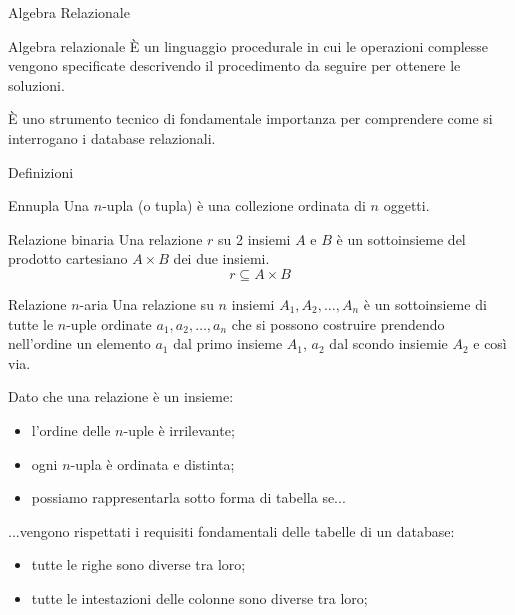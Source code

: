 \begin{frame}{Algebra Relazionale}
    \begin{block}{Algebra relazionale}
        \`E un linguaggio procedurale in cui le operazioni complesse vengono specificate descrivendo il procedimento da seguire per ottenere le soluzioni.
    \end{block}
    
    \noindent \`E uno strumento tecnico di fondamentale importanza per comprendere come si interrogano i database relazionali.
        
    
    \end{frame}
    \begin{frame}[allowframebreaks]{Definizioni}
        \begin{minipage}{0.7\textwidth}
            \begin{block}{Ennupla}
                Una $n$-upla (o tupla) \`e una collezione ordinata di $n$ oggetti.
            \end{block}
          \end{minipage}
        \begin{block}{Relazione binaria}
            Una relazione $r$ su 2 insiemi $A$ e $B$ \`e un sottoinsieme del prodotto cartesiano $A \times B$ dei due insiemi.
            \[ r \subseteq A \times B\]
        \end{block}
        \begin{block}{Relazione $n$-aria}
        Una relazione su $n$ insiemi $A_1, A_2, \dotsc, A_n$ \`e un sottoinsieme di tutte le $n$-uple ordinate $a_1,a_2,\dotsc,a_n$ che si possono costruire prendendo nell'ordine un elemento $a_1$ dal primo insieme $A_1$, $a_2$ dal scondo insiemie $A_2$ e cos\`i via.
        \end{block}
        {Dato che una relazione \`e un insieme:
        \begin{itemize}
            \item l'ordine delle $n$-uple \`e irrilevante;
            \item ogni $n$-upla \`e ordinata e distinta;
            \item possiamo rappresentarla sotto forma di tabella se...
        \end{itemize}}
        \framebreak
        ...vengono rispettati i requisiti fondamentali delle tabelle di un database:
        \begin{itemize}
            \item tutte le righe sono diverse tra loro;
            \item tutte le intestazioni delle colonne sono diverse tra loro;

\end{itemize}
\end{frame}
